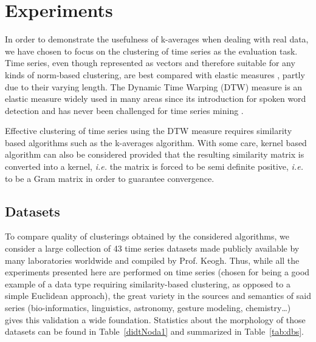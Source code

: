 \documentclass[10pt,letterpaper]{article}
\begin{document}
\section{Experiments}
\label{sec:experiments}

In order to demonstrate the usefulness of k-averages when dealing with real data, we have chosen to focus on the clustering of time series as the evaluation task. Time series, even though represented as vectors and therefore suitable for any kinds of norm-based clustering, are best compared with elastic measures \cite{Ding:2008:QMT:1454159.1454226, Wang:2013:ECR:2429736.2429754}, partly due to their varying length. The Dynamic Time Warping (DTW) measure is an elastic measure widely used in many areas since its introduction for spoken word detection \cite{1163055} and has never been challenged for time series mining \cite{conf/kdd/BerndtC94, Rakthanmanon:2013:ABD:2513092.2500489}.

Effective clustering of time series using the DTW measure requires similarity based algorithms such as the k-averages algorithm. With some care, kernel based algorithm can also be considered provided that the resulting similarity matrix is converted into a kernel, \textit{i.e.} the matrix is forced to be semi definite positive, \textit{i.e.} to be a Gram matrix \cite{Lanckriet:2004:LKM:1005332.1005334} in order to guarantee convergence.

\subsection{Datasets}

To compare quality of clusterings obtained by the considered algorithms, we consider a large collection of 43 time series datasets made publicly available by many laboratories worldwide and compiled by Prof. Keogh. Thus, while all the experiments presented here are performed on time series (chosen for being a good example of a data type requiring similarity-based clustering, as opposed to a simple Euclidean approach), the great variety in the sources and semantics of said series (bio-informatics, linguistics, astronomy, gesture modeling, chemistry\ldots{}) gives this validation a wide foundation. Statistics about the morphology of those datasets can be found in Table~\ref{didtNoda1} and summarized in Table~\ref{tab:dbs}.

\end{document}
